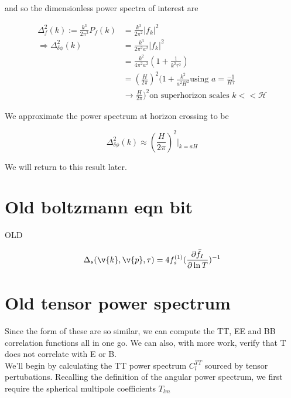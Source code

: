 and so the dimensionless power spectra of interest are  

\begin{equation}\begin{split}
\Delta^2_f(k):=\frac{k^3}{2\pi^2}P_f(k) &= \frac{k^3}{2\pi^2}|f_k|^2\\
\Rightarrow \Delta^2_{\delta\phi}(k) &=\frac{k^3}{2\pi^2a^2}|f_k|^2\\
&=\frac{k^2}{4\pi^2a^2}(1+\frac{1}{k^2\tau^2})\\
&=(\frac{H}{2\pi})^2(1+\frac{k^2}{a^2H^2} \text{using $a=\frac{-1}{H\tau}$}\\
&\rightarrow \frac{H}{2\pi})^2 \text{on superhorizon scales $k<<\mathcal{H}$}
\label{inflatonpower}
\end{split}\end{equation}

We approximate the power spectrum at horizon crossing to be 

\begin{equation}
\Delta^2_{\delta\phi}(k) \approx (\frac{H}{2\pi})^2\rvert_{k=aH}
\end{equation}

We will return to this result later.








\section{Old boltzmann eqn bit}

OLD


\begin{equation}
\Delta_s(\v{k}, \v{p}, \tau) = 4f^{(1)}_s(\frac{\partial\bar{f}_I}{\partial \ln{T}})^{-1}
\end{equation}





\section{Old tensor power spectrum}

Since the form of these are so similar, we can compute the TT, EE and BB correlation functions all in one go. We can also, with more work, verify that T does not correlate with E or B.\\

We'll begin by calculating the TT power spectrum $C_l^{TT}$ sourced by tensor pertubations. Recalling the definition of the angular power spectrum, we first require the spherical multipole coefficients $T_{lm}$  

